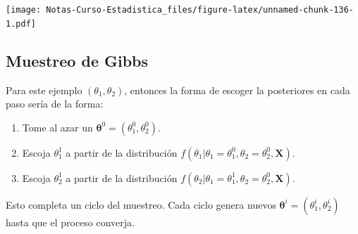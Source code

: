 \documentclass[
  12pt,
]{book}
\newenvironment{Shaded}{\begin{snugshade}}{\end{snugshade}}
\newcommand{\DataTypeTok}[1]{\textcolor[rgb]{0.13,0.29,0.53}{#1}}
\newcommand{\DecValTok}[1]{\textcolor[rgb]{0.00,0.00,0.81}{#1}}
\newcommand{\FloatTok}[1]{\textcolor[rgb]{0.00,0.00,0.81}{#1}}
\newcommand{\KeywordTok}[1]{\textcolor[rgb]{0.13,0.29,0.53}{\textbf{#1}}}
\newcommand{\NormalTok}[1]{#1}
\newcommand{\OperatorTok}[1]{\textcolor[rgb]{0.81,0.36,0.00}{\textbf{#1}}}
\newcommand{\StringTok}[1]{\textcolor[rgb]{0.31,0.60,0.02}{#1}}
\providecommand{\tightlist}{%
  \setlength{\itemsep}{0pt}\setlength{\parskip}{0pt}}
\theoremstyle{definition}
\theoremstyle{definition}
\theoremstyle{definition}
\theoremstyle{remark}
\begin{document}
\texttt{[image: Notas-Curso-Estadistica\_files/figure-latex/unnamed-chunk-136-1.pdf]}

\begin{Shaded}
\end{Shaded}

\hypertarget{muestreo-de-gibbs}{%
\subsection{Muestreo de Gibbs}\label{muestreo-de-gibbs}}

Para este ejemplo \(\left( \theta_{1},\theta_{2} \right)\), entonces la forma de escoger la posteriores en cada paso sería de la forma:

\begin{enumerate}
\def\labelenumi{\arabic{enumi}.}
\tightlist
\item
  Tome al azar un \(\boldsymbol{\theta}^{0} = \left( \theta_{1}^{0},\theta_{2}^{0} \right)\).
\item
  Escoja \(\theta_{1}^{1}\) a partir de la distribución
  \(f\left(\theta_{1} \vert \theta_{1}=\theta_{1}^{0}, \theta_{2}=\theta_{2}^{0}, \boldsymbol{X} \right)\).
\item
  Escoja \(\theta_{2}^{1}\) a partir de la distribución
  \(f\left(\theta_{2} \vert \theta_{1}=\theta_{1}^{1}, \theta_{2}=\theta_{2}^{0}, \boldsymbol{X} \right)\).
\end{enumerate}

Esto completa un ciclo del muestreo. Cada ciclo genera nuevos \(\boldsymbol{\theta}^{i} = \left( \theta_{1}^{i},\theta_{2}^{i} \right)\) hasta que el proceso converja.
\end{document}
